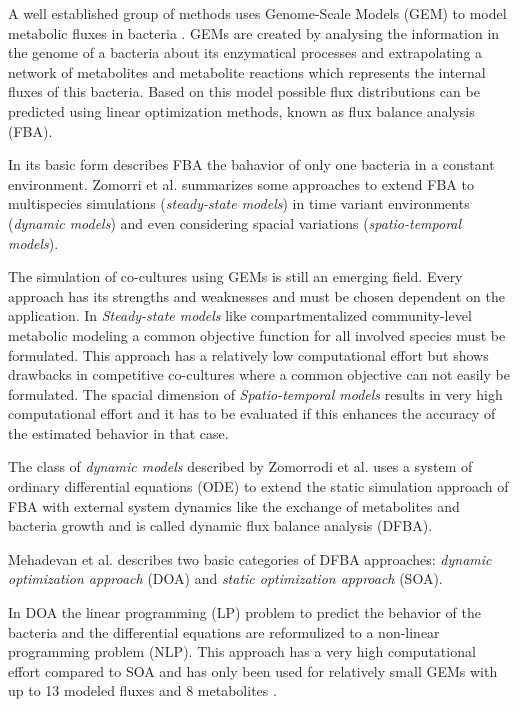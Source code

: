 
A well established group of methods uses Genome-Scale Models (GEM) to model metabolic fluxes in 
bacteria \cite{zomorrodi_synthetic_2016}.
GEMs are created by analysing the information in the genome of a bacteria about its enzymatical
processes and extrapolating a network of metabolites and metabolite reactions which represents
the internal fluxes of this bacteria. Based on this model possible flux distributions can be
predicted using linear optimization methods, known as flux balance analysis (FBA)\cite{orth_what_2010}.

In its basic form describes FBA the bahavior of only one bacteria in a constant environment.
Zomorri et al. summarizes some approaches to extend FBA to multispecies simulations
(\textit{steady-state models}) in time variant environments (\textit{dynamic models})
and even considering spacial variations (\textit{spatio-temporal models})\cite{zomorrodi_synthetic_2016}.

The simulation of co-cultures using GEMs is still an emerging field. Every approach has
its strengths and weaknesses and must be chosen dependent on the application.
In \textit{Steady-state models} like compartmentalized community-level metabolic modeling a
common objective function for all involved species must be formulated. This approach has 
a relatively low computational effort but shows drawbacks in competitive co-cultures where
a common objective can not easily be formulated.
The spacial dimension of \textit{Spatio-temporal models} results in very high computational
effort and it has to be evaluated if this enhances the accuracy of the estimated behavior
in that case.

The class of \textit{dynamic models} described by Zomorrodi et al. uses a system of ordinary
differential equations (ODE)
to extend the static simulation approach of FBA with external system dynamics like the exchange
of metabolites and bacteria growth and is called dynamic flux balance analysis (DFBA)\cite{zomorrodi_synthetic_2016}.

Mehadevan et al. describes two basic categories of DFBA approaches: \textit{dynamic optimization
approach} (DOA) and \textit{static optimization approach} (SOA)\cite{mahadevan_dynamic_2002}.

In DOA the linear programming (LP) problem to predict the behavior of the bacteria and the
differential equations are reformulized to a non-linear programming problem (NLP). 
This approach has a very high computational effort\cite{hoffner_reliable_2013} compared to SOA
and has only been used for relatively small GEMs with up to 13 modeled fluxes and 8 metabolites
\cite{luo_dynamic_2006} \cite{luo_photosynthetic_2009}.

